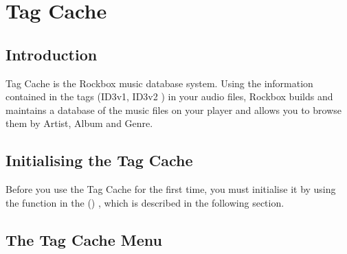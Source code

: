 \section{\label{ref:tagcache}Tag Cache}

\subsection{Introduction}
Tag Cache is the Rockbox music database system. Using the information
contained in the tags (ID3v1, ID3v2%
) in your audio files, Rockbox builds and maintains a database of the music
files on your player and allows you to browse them by Artist, Album and Genre.

\subsection{Initialising the Tag Cache}
Before you use the Tag Cache for the first time, you must initialise it by using
the  function in the 
()
, which is described in the following section.

\subsection{\label{ref:tagcachemenu}The Tag Cache Menu}

